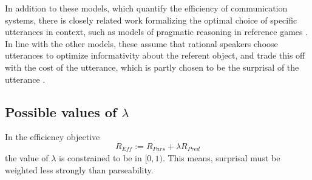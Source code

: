 \documentclass[10pt,twoside,lineno]{article}
\newcommand{\key}[1]{\textbf{#1}}
\begin{document}
In addition to these models, which quantify the efficiency of communication systems, there is closely related work formalizing the optimal choice of specific utterances in context, such as models of pragmatic reasoning in reference games \cite{frank2012predicting,goodman2013knowledge, kao2014nonliteral}.
In line with the other models, these assume that rational speakers choose utterances to optimize informativity about the referent object, and trade this off with the cost of the utterance, which is partly chosen to be the surprisal of the utterance \cite{bennett2018extremely}.








\subsection{Possible values of $\lambda$}\label{sec:lambda}

In the efficiency objective
\begin{equation}\label{eq:efficiency}
	R_{\textit{Eff}} := R_{\textit{Pars}} + \lambda R_\textit{Pred}
\end{equation}
the value of $\lambda$ is constrained to be in $[0,1)$.
This means, surprisal must be weighted less strongly than parseability.
\end{document}
